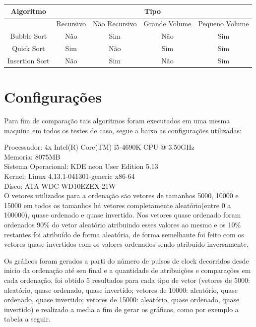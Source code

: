 \documentclass[12pt]{article}
\begin{document}
	\vspace{1cm}

\begin{tabular}{|c|c|c|c|c|}
\hline 
Algoritmo & \multicolumn{4}{c|}{Tipo} \\ 
\hline 
 & Recursivo & Não Recursivo & Grande Volume & Pequeno Volume \\ 
\hline 
Bubble Sort & Não & Sim & Não & Sim \\ 
\hline 
Quick Sort & Sim & Não & Sim & Sim \\ 
\hline 
Insertion Sort & Não & Sim & Não & Sim \\ 
\hline 
\end{tabular} 

	\vspace{1cm}

\section{Configurações}
Para fim de comparação tais algoritmos foram executados em uma mesma maquina em todos os testes de caso, segue a baixo as configurações utilizadas:

\noindent
Processador: 4x Intel(R) Core(TM) i5-4690K CPU @ 3.50GHz\\
Memoria: 8075MB\\
Sistema Operacional: KDE neon User Edition 5.13\\
Kernel: Linux 4.13.1-041301-generic x86-64\\
Disco: ATA WDC WD10EZEX-21W\\

O vetores utilizados para a ordenação são vetores de tamanhos 5000, 10000 e 15000 em todos os tamanhos há vetores completamente aleatório(entre 0 a 100000), quase ordenado e quase invertido. Nos vetores quase ordenado foram ordenados 90\%  do vetor aleatório atribuindo esses valores ao mesmo e os 10\% restantes foi atribuído de forma aleatória, de forma semelhante foi feito com os vetores quase invertidos com os valores ordenados sendo atribuido inversamente. 
 
Os gráficos foram gerados a parti do número de pulsos de clock decorridos desde inicio da ordenação até seu final e a quantidade de atribuições e comparações em cada ordenação, foi obtido 5 resultados para cada tipo de vetor (vetores de 5000: aleatório, quase ordenado, quase invertido; vetores de 10000: aleatório, quase ordenado, quase invertido; vetores de 15000: aleatório, quase ordenado, quase invertido) e realizado a media a fim de gerar os gráficos, como por exemplo a tabela a seguir.
\end{document}
